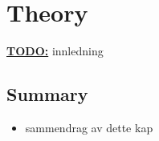 \chapter{Theory}
\label{chapter:theory}

\textbf{\underline{\LARGE TODO:}} innledning







\section{Summary}
\label{sect:theory:summary}
\begin{itemize}
  \item sammendrag av dette kap
\end{itemize}